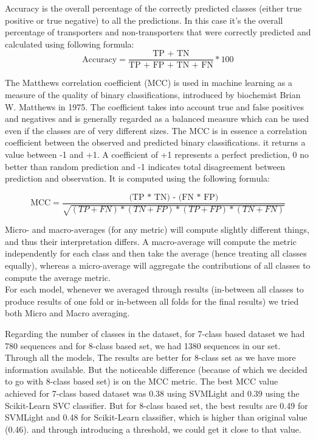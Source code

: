         Accuracy is the overall percentage of the correctly predicted classes (either true positive or true negative) to all the 
        predictions. In this case it's the overall percentage of transporters and non-transporters 
        that were correctly predicted and calculated using following formula:
        \begin{equation}
            \text{Accuracy} = \frac {\text{TP + TN}}{\text{TP + FP + TN + FN}} * 100
        \end{equation}

        The Matthews correlation coefficient (MCC) is used in machine learning as a measure of the quality of binary 
        classifications, introduced by biochemist Brian W. Matthews in 1975. The coefficient takes into account true 
        and false positives and negatives and is generally regarded as a balanced measure which can be used even if the classes 
        are of very different sizes. The MCC is in essence a correlation coefficient between the observed and predicted binary 
        classifications. it returns a value between -1 and +1. A coefficient of +1 represents a perfect prediction, 0 no better than 
        random prediction and -1 indicates total disagreement between prediction and observation. It is computed using the following 
        formula: 

        \begin{equation}
            \text{MCC} = \frac {\text{(TP * TN) - (FN * FP)}}{\sqrt{(TP + FN) * (TN + FP) * (TP + FP) * (TN + FN)}}
        \end{equation}

        Micro- and macro-averages (for any metric) will compute slightly different things, and thus their interpretation differs. 
        A macro-average will compute the metric independently for each class and then take the average (hence treating 
        all classes equally), whereas a micro-average will aggregate the contributions of all classes to compute the average metric.\\

        For each model, whenever we averaged through results (in-between all classes to produce results of one fold or 
        in-between all folds for the final results) we tried both Micro and Macro averaging. 

        Regarding the number of classes in the dataset, for 7-class based dataset we had 780 sequences and for 8-class based set, 
        we had 1380 sequences in our set. Through all the models, The results are better for 8-class set as we have more information 
        available. But the noticeable difference (because of which we decided to go with 8-class based set) is on the MCC metric. 
        The best MCC value achieved for 7-class based dataset was 0.38 using SVMLight and 0.39 using the Scikit-Learn SVC classifier. 
        But for 8-class based set, the best results are 0.49 for SVMLight and 0.48 for Scikit-Learn classifier, which is higher than 
        original value (0.46). and through introducing a threshold, we could get it close to that value.\\

